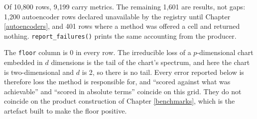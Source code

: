 \documentclass[
  british,
  a4paper,
]{book}
\newenvironment{Shaded}{\begin{snugshade}}{\end{snugshade}}
\newcommand{\AttributeTok}[1]{\textcolor[rgb]{0.13,0.29,0.53}{#1}}
\newcommand{\FunctionTok}[1]{\textcolor[rgb]{0.13,0.29,0.53}{\textbf{#1}}}
\newcommand{\NormalTok}[1]{#1}
\newcommand{\OtherTok}[1]{\textcolor[rgb]{0.56,0.35,0.01}{#1}}
\newcommand{\SpecialCharTok}[1]{\textcolor[rgb]{0.81,0.36,0.00}{\textbf{#1}}}
\newcommand{\StringTok}[1]{\textcolor[rgb]{0.31,0.60,0.02}{#1}}
\begin{document}
\begin{Shaded}
\end{Shaded}

Of 10,800 rows, 9,199
carry metrics. The remaining 1,601
are results, not gaps: 1,200 autoencoder rows
declared unavailable by the registry until Chapter \ref{autoencoders}, and
401 rows where a method was offered a cell and returned nothing.
\texttt{report\_failures()} prints the same accounting from the producer.

The \texttt{floor} column is 0 in every row. The irreducible loss of a
\(p\)-dimensional chart embedded in \(d\) dimensions is the tail of the chart's
spectrum, and here the chart is two-dimensional and \(d\) is 2, so
there is no tail. Every error reported below is therefore loss the method is
responsible for, and ``scored against what was achievable'' and ``scored in
absolute terms'' coincide on this grid. They do not coincide on the product
construction of Chapter \ref{benchmarks}, which is the artefact built to make
the floor positive.
\end{document}
